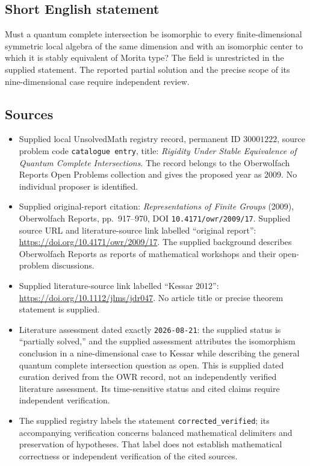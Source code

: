 \documentclass[11pt]{article}
\begin{document}
\subsection{Short English statement}
Must a quantum complete intersection be isomorphic to every finite-dimensional symmetric local algebra of the same dimension and with an isomorphic center to which it is stably equivalent of Morita type? The field is unrestricted in the supplied statement. The reported partial solution and the precise scope of its nine-dimensional case require independent review.
\subsection{Sources}
\begin{itemize}
\item Supplied local UnsolvedMath registry record, permanent ID \(30001222\), source problem code \texttt{catalogue entry}, title: \emph{Rigidity Under Stable Equivalence of Quantum Complete Intersections}. The record belongs to the Oberwolfach Reports Open Problems collection and gives the proposed year as 2009. No individual proposer is identified.
\item Supplied original-report citation: \emph{Representations of Finite Groups} (2009), Oberwolfach Reports, pp.~917--970, DOI \texttt{10.4171/owr/2009/17}. Supplied source URL and literature-source link labelled ``original report'': \url{https://doi.org/10.4171/owr/2009/17}. The supplied background describes Oberwolfach Reports as reports of mathematical workshops and their open-problem discussions.
\item Supplied literature-source link labelled ``Kessar 2012'': \url{https://doi.org/10.1112/jlms/jdr047}. No article title or precise theorem statement is supplied.
\item Literature assessment dated exactly \texttt{2026-08-21}: the supplied status is ``partially solved,'' and the supplied assessment attributes the isomorphism conclusion in a nine-dimensional case to Kessar while describing the general quantum complete intersection question as open. This is supplied dated curation derived from the OWR record, not an independently verified literature assessment. Its time-sensitive status and cited claims require independent verification.
\item The supplied registry labels the statement \texttt{corrected\_verified}; its accompanying verification concerns balanced mathematical delimiters and preservation of hypotheses. That label does not establish mathematical correctness or independent verification of the cited sources.
\end{itemize}
\end{document}
